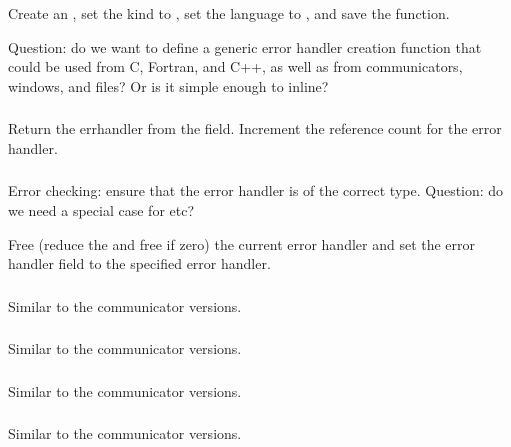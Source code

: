 \documentclass{article}
\begin{document}
\subsubsection{}
Create an , set the kind to
, set the language to , and
save the function.  

Question: do we want to define a generic error handler
creation function that could be used from C, Fortran, and C++, as well as from
communicators, windows, and files?  Or is it simple enough to inline?

\subsubsection{}
Return the errhandler from the  field.  Increment the 
reference count for the error handler.

\subsubsection{}
Error checking: ensure that the error handler is of the correct type.  
Question: do we need a special case for  etc?

Free (reduce the  and free if zero) the current error handler
and set the error handler field to the specified error handler.

\subsubsection{}
Similar to the communicator versions.

\subsubsection{}
Similar to the communicator versions.

\subsubsection{}
Similar to the communicator versions.

\subsubsection{}
Similar to the communicator versions.
\end{document}
